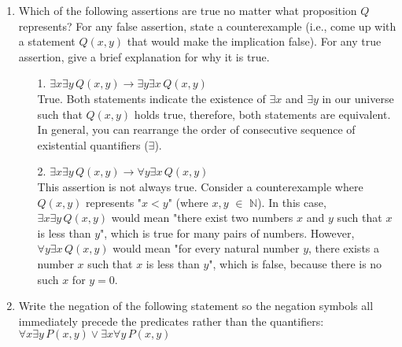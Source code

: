\documentclass[11pt]{article}
\begin{document}
\vspace{.5cm}

\begin{enumerate}
\item Which of the following assertions are true no matter what proposition $Q$ represents? For any false assertion, state a counterexample (i.e., come up with a statement $Q(x,y)$ that would make the implication false). For any true assertion, give a brief explanation for why it is true.

  \begin{enumerate}
  \item[1.] $\exists x \exists y \, Q(x,y) \rightarrow \exists y \exists x \, Q(x,y)$\\
  
  True. Both statements indicate the existence of $\exists x$ and $\exists y$ in our universe such that $Q(x,y)$ holds true, therefore, both statements are equivalent. In general, you can rearrange the order of consecutive sequence of existential quantifiers ($ \exists$).\\

  \item[2.] $\exists x \exists y \, Q(x,y) \rightarrow \forall y \exists x \, Q(x,y)$\\
  
  This assertion is not always true. Consider a counterexample where $Q(x,y)$ represents "$x < y$" (where $x,y$ $\in$ $\mathbb{N}$). In this case, $\exists x \exists y \, Q(x,y)$ would mean "there exist two numbers $x$ and $y$ such that $x$ is less than $y$", which is true for many pairs of numbers. However, $\forall y \exists x \, Q(x,y)$ would mean "for every natural number $y$, there exists a number $x$ such that $x$ is less than $y$", which is false, because there is no such $x$ for $y = 0$.\\



  \end{enumerate}

\newpage
\item Write the negation of the following statement so the negation symbols all immediately precede the predicates rather than the quantifiers: $ \forall x \exists y \, P(x,y) \lor \exists x \forall y \, P(x,y)$\\


\end{enumerate}
\end{document}
